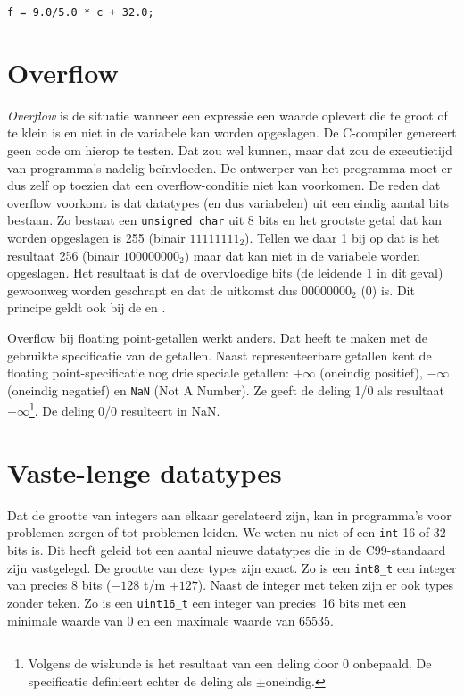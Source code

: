 \begin{lstlisting}[style=lstoneline]
f = 9.0/5.0 * c + 32.0;
\end{lstlisting}
 

\section{Overflow}
\textsl{Overflow} is de situatie wanneer een expressie een waarde oplevert die te groot of te klein is en niet in de variabele kan worden opgeslagen. De C-compiler genereert geen code om hierop te testen. Dat zou wel kunnen, maar dat zou de executietijd van programma's nadelig beïnvloeden. De ontwerper van het programma moet er dus zelf op toezien dat een overflow-conditie niet kan voorkomen. De reden dat overflow voorkomt is dat datatypes (en dus variabelen) uit een eindig aantal bits bestaan. Zo bestaat een \texttt{unsigned char} uit 8 bits en het grootste getal dat kan worden opgeslagen is 255 (binair $11111111_2$). Tellen we daar 1 bij op dat is het resultaat 256 (binair $100000000_2$) maar dat kan niet in de variabele worden opgeslagen. Het resultaat is dat de overvloedige bits (de leidende 1  in dit geval) gewoonweg worden geschrapt en dat de uitkomst dus $00000000_2$ (0) is. Dit principe geldt ook bij de  en .

Overflow bij floating point-getallen werkt anders. Dat heeft te maken met de gebruikte specificatie van de getallen.
Naast representeerbare getallen kent de floating point-specificatie nog drie speciale getallen: $+\infty$ (oneindig positief), $-\infty$ (oneindig negatief) en \texttt{NaN} (Not A Number). Ze geeft de deling 1/0 als resultaat $+\infty$\footnote{Volgens de wiskunde is het resultaat van een deling door 0 onbepaald. De specificatie definieert echter de deling als $\pm$oneindig.}. De deling 0/0 resulteert in NaN.


\section{Vaste-lenge datatypes}
Dat de grootte van integers aan elkaar gerelateerd zijn, kan in programma's voor problemen zorgen of tot problemen leiden. We weten nu niet of een \texttt{int} 16 of 32 bits is. Dit heeft geleid tot een aantal nieuwe datatypes die in de C99-standaard zijn vastgelegd. De grootte van deze types zijn exact. Zo is een \texttt{int8\_t} een integer van precies 8 bits ($-128$ t/m $+127$). Naast de integer met teken zijn er ook types zonder teken. Zo is een \texttt{uint16\_t} een integer van precies~16 bits met een minimale waarde van 0 en een maximale waarde van 65535.

